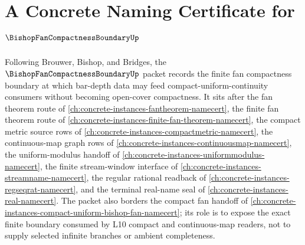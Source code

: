 \chapter{A Concrete Naming Certificate for $\BishopFanCompactnessBoundaryUp$}
\label{ch:concrete-instances-bishop-fan-compactness-boundary-namecert}

Following Brouwer, Bishop, and Bridges, the $\BishopFanCompactnessBoundaryUp$ packet records the finite fan compactness boundary at which bar-depth data may feed compact-uniform-continuity consumers without becoming open-cover compactness. It sits after the fan theorem route of \autoref{ch:concrete-instances-fantheorem-namecert}, the finite fan theorem route of \autoref{ch:concrete-instances-finite-fan-theorem-namecert}, the compact metric source rows of \autoref{ch:concrete-instances-compactmetric-namecert}, the continuous-map graph rows of \autoref{ch:concrete-instances-continuousmap-namecert}, the uniform-modulus handoff of \autoref{ch:concrete-instances-uniformmodulus-namecert}, the finite stream-window interface of \autoref{ch:concrete-instances-streamname-namecert}, the regular rational readback of \autoref{ch:concrete-instances-regseqrat-namecert}, and the terminal real-name seal of \autoref{ch:concrete-instances-real-namecert}. The packet also borders the compact fan handoff of \autoref{ch:concrete-instances-compact-uniform-bishop-fan-namecert}; its role is to expose the exact finite boundary consumed by L10 compact and continuous-map readers, not to supply selected infinite branches or ambient completeness.

